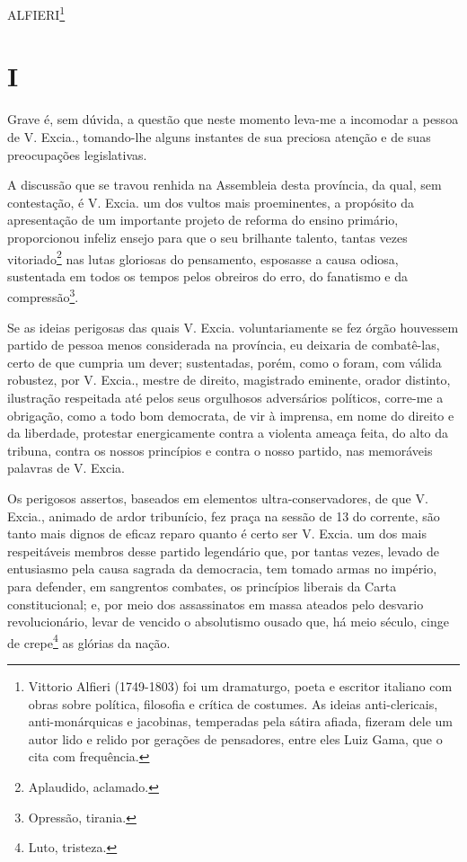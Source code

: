 ALFIERI\footnote{Vittorio Alfieri (1749-1803) foi um dramaturgo, poeta
  e escritor italiano com obras sobre política, filosofia e crítica de
  costumes. As ideias anti-clericais, anti-monárquicas e jacobinas,
  temperadas pela sátira afiada, fizeram dele um autor lido e relido por
  gerações de pensadores, entre eles Luiz Gama, que o cita com
  frequência.}

\section{I}

Grave é, sem dúvida, a questão que neste momento leva-me a incomodar a
pessoa de V. Excia., tomando-lhe alguns instantes de sua preciosa
atenção e de suas preocupações legislativas.

A discussão que se travou renhida na Assembleia desta província, da
qual, sem contestação, é V. Excia. um dos vultos mais proeminentes, a
propósito da apresentação de um importante projeto de reforma do ensino
primário, proporcionou infeliz ensejo para que o seu brilhante talento,
tantas vezes vitoriado\footnote{Aplaudido, aclamado.} nas lutas
gloriosas do pensamento, esposasse a causa odiosa, sustentada em todos
os tempos pelos obreiros do erro, do fanatismo e da
compressão\footnote{Opressão, tirania.}.

Se as ideias perigosas das quais V. Excia. voluntariamente se fez órgão
houvessem partido de pessoa menos considerada na província, eu deixaria
de combatê-las, certo de que cumpria um dever; sustentadas, porém, como
o foram, com válida robustez, por V. Excia., mestre de direito,
magistrado eminente, orador distinto, ilustração respeitada até pelos
seus orgulhosos adversários políticos, corre-me a obrigação, como a todo
bom democrata, de vir à imprensa, em nome do direito e da liberdade,
protestar energicamente contra a violenta ameaça feita, do alto da
tribuna, contra os nossos princípios e contra o nosso partido, nas
memoráveis palavras de V. Excia.

Os perigosos assertos, baseados em elementos ultra-conservadores, de que
V. Excia., animado de ardor tribunício, fez praça na sessão de 13 do
corrente, são tanto mais dignos de eficaz reparo quanto é certo ser V.
Excia. um dos mais respeitáveis membros desse partido legendário que,
por tantas vezes, levado de entusiasmo pela causa sagrada da democracia,
tem tomado armas no império, para defender, em sangrentos combates, os
princípios liberais da Carta constitucional; e, por meio dos
assassinatos em massa ateados pelo desvario revolucionário, levar de
vencido o absolutismo ousado que, há meio século, cinge de
crepe\footnote{Luto, tristeza.} as glórias da nação.

